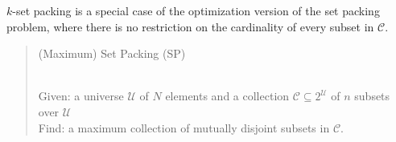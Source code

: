 $k$-set packing is a special case of the optimization version of the set packing problem, where there is no restriction on the cardinality of every subset in $\mathcal{C}$.
%
\begin{quote}
\begin{bf}(Maximum) Set Packing (SP)\end{bf}\\
Given: a universe $\mathcal{U}$ of $N$ elements and a collection $\mathcal{C} \subseteq 2^\mathcal{U}$ of $n$ subsets over $\mathcal{U}$ \\
Find: a maximum collection of mutually disjoint subsets in $\mathcal{C}$.
\end{quote}
%
%
%
%

